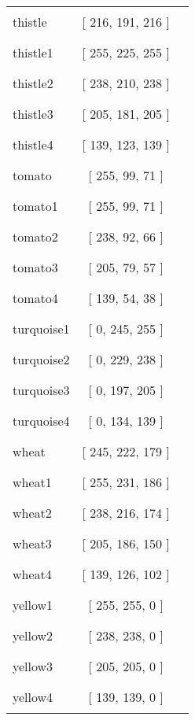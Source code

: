 \begin{tabular}{|l|c|c|}
thistle & [ 216, 191, 216 ] & \color{thistle} \rule{1cm}{1.5ex}\\
thistle1 & [ 255, 225, 255 ] & \color{thistle1} \rule{1cm}{1.5ex}\\
thistle2 & [ 238, 210, 238 ] & \color{thistle2} \rule{1cm}{1.5ex}\\
thistle3 & [ 205, 181, 205 ] & \color{thistle3} \rule{1cm}{1.5ex}\\
thistle4 & [ 139, 123, 139 ] & \color{thistle4} \rule{1cm}{1.5ex}\\
tomato & [ 255, 99, 71 ] & \color{tomato} \rule{1cm}{1.5ex}\\
tomato1 & [ 255, 99, 71 ] & \color{tomato1} \rule{1cm}{1.5ex}\\
tomato2 & [ 238, 92, 66 ] & \color{tomato2} \rule{1cm}{1.5ex}\\
tomato3 & [ 205, 79, 57 ] & \color{tomato3} \rule{1cm}{1.5ex}\\
tomato4 & [ 139, 54, 38 ] & \color{tomato4} \rule{1cm}{1.5ex}\\
turquoise1 & [ 0, 245, 255 ] & \color{turquoise1} \rule{1cm}{1.5ex}\\
turquoise2 & [ 0, 229, 238 ] & \color{turquoise2} \rule{1cm}{1.5ex}\\
turquoise3 & [ 0, 197, 205 ] & \color{turquoise3} \rule{1cm}{1.5ex}\\
turquoise4 & [ 0, 134, 139 ] & \color{turquoise4} \rule{1cm}{1.5ex}\\
wheat & [ 245, 222, 179 ] & \color{wheat} \rule{1cm}{1.5ex}\\
wheat1 & [ 255, 231, 186 ] & \color{wheat1} \rule{1cm}{1.5ex}\\
wheat2 & [ 238, 216, 174 ] & \color{wheat2} \rule{1cm}{1.5ex}\\
wheat3 & [ 205, 186, 150 ] & \color{wheat3} \rule{1cm}{1.5ex}\\
wheat4 & [ 139, 126, 102 ] & \color{wheat4} \rule{1cm}{1.5ex}\\
yellow1 & [ 255, 255, 0 ] & \color{yellow1} \rule{1cm}{1.5ex}\\
yellow2 & [ 238, 238, 0 ] & \color{yellow2} \rule{1cm}{1.5ex}\\
yellow3 & [ 205, 205, 0 ] & \color{yellow3} \rule{1cm}{1.5ex}\\
yellow4 & [ 139, 139, 0 ] & \color{yellow4} \rule{1cm}{1.5ex}\\
\end{tabular}

